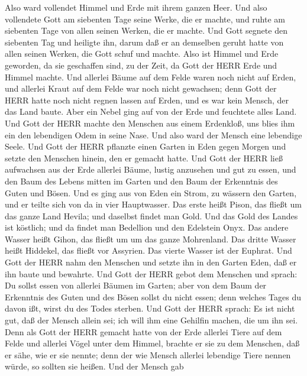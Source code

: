  Also ward vollendet Himmel und Erde mit ihrem ganzen Heer.
 Und also vollendete Gott am siebenten Tage seine Werke, die
er machte, und ruhte am siebenten Tage von allen seinen Werken, die er
machte.  Und Gott segnete den siebenten Tag und heiligte
ihn, darum daß er an demselben geruht hatte von allen seinen Werken, die
Gott schuf und machte.  Also ist Himmel und Erde geworden,
da sie geschaffen sind, zu der Zeit, da Gott der HERR Erde und Himmel
machte.  Und allerlei Bäume auf dem Felde waren noch nicht
auf Erden, und allerlei Kraut auf dem Felde war noch nicht gewachsen;
denn Gott der HERR hatte noch nicht regnen lassen auf Erden, und es war
kein Mensch, der das Land baute.  Aber ein Nebel ging auf
von der Erde und feuchtete alles Land.  Und Gott der HERR
machte den Menschen aus einem Erdenkloß, uns blies ihm ein den
lebendigen Odem in seine Nase. Und also ward der Mensch eine lebendige
Seele.  Und Gott der HERR pflanzte einen Garten in Eden
gegen Morgen und setzte den Menschen hinein, den er gemacht hatte.
 Und Gott der HERR ließ aufwachsen aus der Erde allerlei
Bäume, lustig anzusehen und gut zu essen, und den Baum des Lebens mitten
im Garten und den Baum der Erkenntnis des Guten und Bösen. 
Und es ging aus von Eden ein Strom, zu wässern den Garten, und er teilte
sich von da in vier Hauptwasser.  Das erste heißt Pison,
das fließt um das ganze Land Hevila; und daselbst findet man Gold.
 Und das Gold des Landes ist köstlich; und da findet man
Bedellion und den Edelstein Onyx.  Das andere Wasser heißt
Gihon, das fließt um um das ganze Mohrenland.  Das dritte
Wasser heißt Hiddekel, das fließt vor Assyrien. Das vierte Wasser ist
der Euphrat.  Und Gott der HERR nahm den Menschen und
setzte ihn in den Garten Eden, daß er ihn baute und bewahrte.
 Und Gott der HERR gebot dem Menschen und sprach: Du sollst
essen von allerlei Bäumen im Garten;  aber von dem Baum der
Erkenntnis des Guten und des Bösen sollst du nicht essen; denn welches
Tages du davon ißt, wirst du des Todes sterben.  Und Gott
der HERR sprach: Es ist nicht gut, daß der Mensch allein sei; ich will
ihm eine Gehilfin machen, die um ihn sei.  Denn als Gott
der HERR gemacht hatte von der Erde allerlei Tiere auf dem Felde und
allerlei Vögel unter dem Himmel, brachte er sie zu dem Menschen, daß er
sähe, wie er sie nennte; denn der wie Mensch allerlei lebendige Tiere
nennen würde, so sollten sie heißen.  Und der Mensch gab
